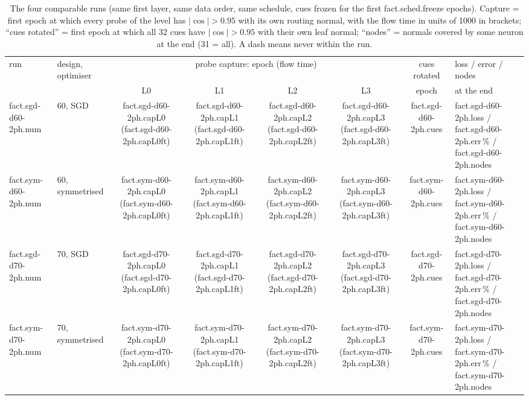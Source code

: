 \documentclass[10pt,a4paper]{article}
\newcommand{\fact}[2]{\csname fact.#1.#2\endcsname}
\newcommand{\runnum}[1]{\fact{#1}{num}}
\begin{document}
\begin{table}[!htbp]\centering\footnotesize\setlength{\tabcolsep}{4pt}
\begin{tabular}{llcccccl}
\toprule
run & design, optimiser & \multicolumn{4}{c}{probe capture: epoch (flow time)} & cues rotated & loss / error / nodes\\
 & & L0 & L1 & L2 & L3 & epoch & at the end\\
\midrule
\runnum{sgd-d60-2ph} & 60, SGD & \fact{sgd-d60-2ph}{capL0} (\fact{sgd-d60-2ph}{capL0ft}) & \fact{sgd-d60-2ph}{capL1} (\fact{sgd-d60-2ph}{capL1ft}) & \fact{sgd-d60-2ph}{capL2} (\fact{sgd-d60-2ph}{capL2ft}) & \fact{sgd-d60-2ph}{capL3} (\fact{sgd-d60-2ph}{capL3ft}) & \fact{sgd-d60-2ph}{cues} & \fact{sgd-d60-2ph}{loss} / \fact{sgd-d60-2ph}{err}\,\% / \fact{sgd-d60-2ph}{nodes}\\
\runnum{sym-d60-2ph} & 60, symmetrised & \fact{sym-d60-2ph}{capL0} (\fact{sym-d60-2ph}{capL0ft}) & \fact{sym-d60-2ph}{capL1} (\fact{sym-d60-2ph}{capL1ft}) & \fact{sym-d60-2ph}{capL2} (\fact{sym-d60-2ph}{capL2ft}) & \fact{sym-d60-2ph}{capL3} (\fact{sym-d60-2ph}{capL3ft}) & \fact{sym-d60-2ph}{cues} & \fact{sym-d60-2ph}{loss} / \fact{sym-d60-2ph}{err}\,\% / \fact{sym-d60-2ph}{nodes}\\
\runnum{sgd-d70-2ph} & 70, SGD & \fact{sgd-d70-2ph}{capL0} (\fact{sgd-d70-2ph}{capL0ft}) & \fact{sgd-d70-2ph}{capL1} (\fact{sgd-d70-2ph}{capL1ft}) & \fact{sgd-d70-2ph}{capL2} (\fact{sgd-d70-2ph}{capL2ft}) & \fact{sgd-d70-2ph}{capL3} (\fact{sgd-d70-2ph}{capL3ft}) & \fact{sgd-d70-2ph}{cues} & \fact{sgd-d70-2ph}{loss} / \fact{sgd-d70-2ph}{err}\,\% / \fact{sgd-d70-2ph}{nodes}\\
\runnum{sym-d70-2ph} & 70, symmetrised & \fact{sym-d70-2ph}{capL0} (\fact{sym-d70-2ph}{capL0ft}) & \fact{sym-d70-2ph}{capL1} (\fact{sym-d70-2ph}{capL1ft}) & \fact{sym-d70-2ph}{capL2} (\fact{sym-d70-2ph}{capL2ft}) & \fact{sym-d70-2ph}{capL3} (\fact{sym-d70-2ph}{capL3ft}) & \fact{sym-d70-2ph}{cues} & \fact{sym-d70-2ph}{loss} / \fact{sym-d70-2ph}{err}\,\% / \fact{sym-d70-2ph}{nodes}\\
\bottomrule
\end{tabular}
\caption{The four comparable runs (same first layer, same data order, same schedule, cues frozen for the first \fact{sched}{freeze} epochs). Capture = first epoch at which every probe of the level has $|\cos|>0.95$ with its own routing normal, with the flow time in units of 1000 in brackets; ``cues rotated'' = first epoch at which all 32 cues have $|\cos|>0.95$ with their own leaf normal; ``nodes'' = normals covered by some neuron at the end (31 = all). A dash means never within the run.}
\label{tab:results}
\end{table}
\end{document}
